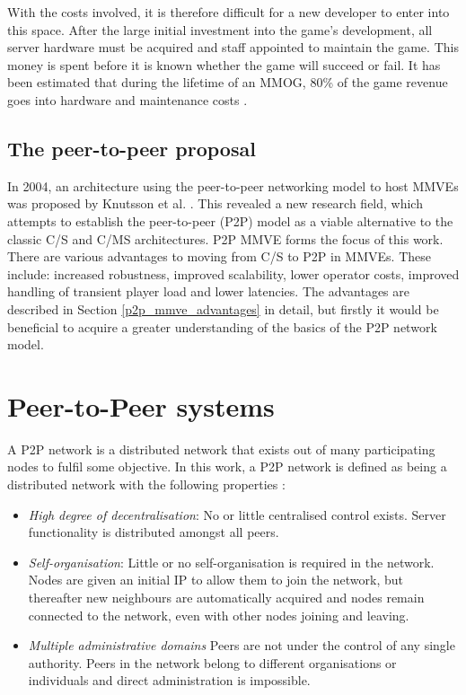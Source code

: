 With the costs involved, it is therefore difficult for a new developer to enter into this space. After the large initial investment into the game's development, all server hardware must be acquired and staff appointed to maintain the game. This money is spent before it is known whether the game will succeed or fail. It has been estimated that during the lifetime of an MMOG, 80\% of the game revenue goes into hardware and maintenance costs \cite{cs_mmog_cost}.

\subsection{The peer-to-peer proposal}

In 2004, an architecture using the peer-to-peer networking model to host MMVEs was proposed by Knutsson et al. \cite{knutsson_p2p_first}. This
revealed a new research field, which attempts to establish the peer-to-peer (P2P) model as a viable alternative to the classic C/S and C/MS
architectures. P2P MMVE forms the focus of this work. There are various advantages to moving from C/S to P2P in MMVEs. These include: increased robustness, improved scalability, lower operator costs, improved handling of transient player load and lower latencies. The advantages are described in Section \ref{p2p_mmve_advantages} in detail,
but firstly it would be beneficial to acquire a greater understanding of the basics of the P2P network model.

\section{Peer-to-Peer systems}

A P2P network is a distributed network that exists out of many participating nodes to fulfil some objective. In this work, a P2P network is defined as being a distributed network with the following properties
\cite{Rodrigues_acm_comms_p2p}:
%
\begin{itemize}
\item \emph{High degree of decentralisation}:  No or little centralised control exists. Server functionality is distributed amongst all peers.
\item \emph{Self-organisation}: Little or no self-organisation is required in the network. Nodes are given an initial IP to allow them to join the network, but thereafter new neighbours are automatically acquired and nodes remain connected to the network, even with other nodes joining and leaving.
\item \emph{Multiple administrative domains} Peers are not under the control of any single authority. Peers in the network belong to different organisations or individuals and direct administration is impossible.
\end{itemize}

